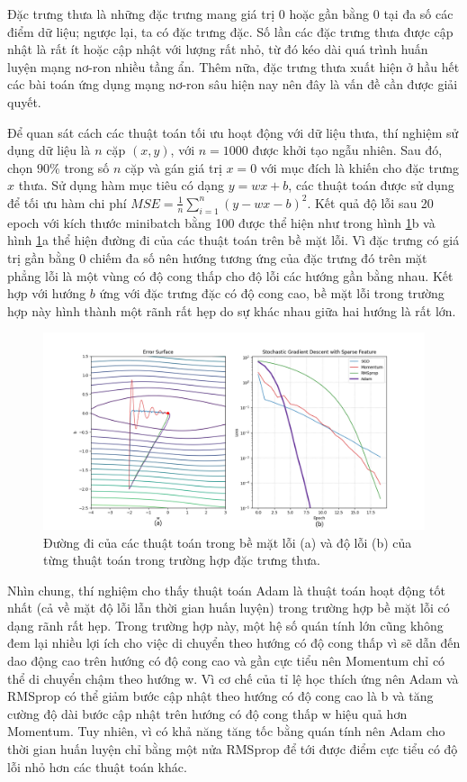Đặc trưng thưa là những đặc trưng mang giá trị 0 hoặc gần bằng 0 tại đa số các điểm dữ liệu; ngược lại, ta có đặc trưng đặc. Số lần các đặc trưng thưa được cập nhật là rất ít hoặc cập nhật với lượng rất nhỏ, từ đó kéo dài quá trình huấn luyện mạng nơ-ron nhiều tầng ẩn. Thêm nữa, đặc trưng thưa xuất hiện ở hầu hết các bài toán ứng dụng mạng nơ-ron sâu hiện nay nên đây là vấn đề cần được giải quyết.

Để quan sát cách các thuật toán tối ưu hoạt động với dữ liệu thưa, thí nghiệm sử dụng dữ liệu là $n$ cặp $(x,y)$, với $n = 1000$ được khởi tạo ngẫu nhiên. Sau đó, chọn $90\%$ trong số $n$ cặp và gán giá trị $x = 0$ với mục đích là khiến cho đặc trưng $x$ thưa. Sử dụng hàm mục tiêu có dạng $y = wx + b$, các thuật toán được sử dụng để tối ưu hàm chi phí $MSE = \frac{1}{n}\sum_{i=1}^n(y - wx - b)^2$. Kết quả độ lỗi sau 20 epoch với kích thước minibatch bằng 100 được thể hiện như trong hình \ref{fig:sparse}b và hình \ref{fig:sparse}a thể hiện đường đi của các thuật toán trên bề mặt lỗi. Vì đặc trưng có giá trị gần bằng 0 chiếm đa số nên hướng tương ứng của đặc trưng đó trên mặt phẳng lỗi là một vùng có độ cong thấp cho độ lỗi các hướng gần bằng nhau. Kết hợp với hướng $b$ ứng với đặc trưng đặc có độ cong cao, bề mặt lỗi trong trường hợp này hình thành một rãnh rất hẹp do sự khác nhau giữa hai hướng là rất lớn.

\begin{figure}[htp]
	\centering
	\includegraphics[width=130 mm]{images/sparse.png}
	\caption{Đường đi của các thuật toán trong bề mặt lỗi (a) và độ lỗi (b) của từng thuật toán trong trường hợp đặc trưng thưa.}
	\label{fig:sparse}
\end{figure}

Nhìn chung, thí nghiệm cho thấy thuật toán Adam là thuật toán hoạt động tốt nhất (cả về mặt độ lỗi lẫn thời gian huấn luyện) trong trường hợp bề mặt lỗi có dạng rãnh rất hẹp. Trong trường hợp này, một hệ số quán tính lớn cũng không đem lại nhiều lợi ích cho việc di chuyển theo hướng có độ cong thấp vì sẽ dẫn đến dao động cao trên hướng có độ cong cao và gần cực tiểu nên Momentum chỉ có thể di chuyển chậm theo hướng w. Vì cơ chế của tỉ lệ học thích ứng nên Adam và RMSprop có thể giảm bước cập nhật theo hướng có độ cong cao là b và tăng cường độ dài bước cập nhật trên hướng có độ cong thấp w hiệu quả hơn Momentum. Tuy nhiên, vì có khả năng tăng tốc bằng quán tính nên Adam cho thời gian huấn luyện chỉ bằng một nửa RMSprop để tới được điểm cực tiểu có độ lỗi nhỏ hơn các thuật toán khác.

